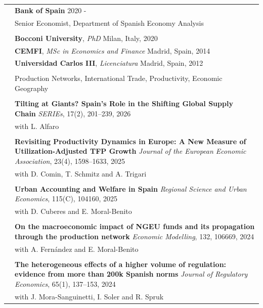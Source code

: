 \documentclass[letterpaper, 11pt]{article}
\begin{document}
\begin{longtable}{p{1.3in}p{4.8in}}
\color{OliveGreen}{Employment}
& \textbf{Bank of Spain} \hfill 2020 - \\
& Senior Economist, Department of Spanish Economy Analysis \\
& \\
\color{OliveGreen}{Education}
& \textbf{Bocconi University}, \textit{PhD} \hfill Milan, Italy, 2020 \\
& \textbf{CEMFI}, \textit{MSc in Economics and Finance} \hfill Madrid, Spain, 2014 \\
& \textbf{Universidad Carlos III}, \textit{Licenciatura} \hfill Madrid, Spain, 2012 \\
& \\
\nohyphens{\color{OliveGreen}{Research interests}}
& Production Networks, International Trade, Productivity, Economic Geography \\
& \\
\color{OliveGreen}{Publications}
& \textbf{Tilting at Giants? Spain's Role in the Shifting Global Supply Chain} \textit{\mbox{SERIEs}}, 17(2), 201--239, 2026 \\
& with L. Alfaro \\
& \\
& \textbf{Revisiting Productivity Dynamics in Europe: A New Measure of Utilization-Adjusted TFP Growth} \textit{Journal of the European Economic Association}, 23(4), 1598--1633, 2025 \\
& with D. Comin, T. Schmitz and A. Trigari \\
& \\
& \textbf{Urban Accounting and Welfare in Spain} \textit{Regional Science and Urban Economics}, 115(C), 104160, 2025 \\
& with D. Cuberes and E. Moral-Benito \\
& \\
& \textbf{On the macroeconomic impact of NGEU funds and its propagation through the production network} \textit{Economic Modelling}, 132, 106669, 2024 \\
& with A. Fernández and E. Moral-Benito \\
& \\
& \textbf{The heterogeneous effects of a higher volume of regulation: evidence from more than 200k Spanish norms} \textit{Journal of Regulatory Economics}, 65(1), 137--153, 2024 \\
& with J. Mora-Sanguinetti, I. Soler and R. Spruk \\

\end{longtable}
\end{document}
